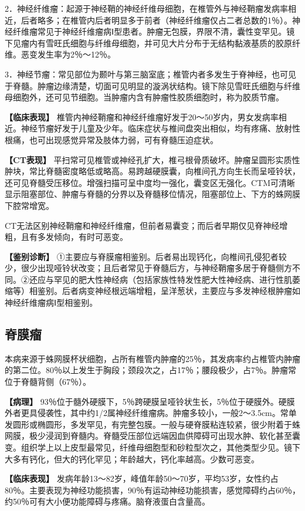 2．神经纤维瘤：起源于神经鞘的神经纤维母细胞，在椎管外与神经鞘瘤发病率相近，后者略多；在椎管内后者明显多于前者（神经纤维瘤仅占二者总数的1％）。神经纤维瘤常见于神经纤维瘤病Ⅰ型患者。肿瘤无包膜，界限不清，囊性变罕见。镜下见瘤内有雪旺氏细胞与纤维母细胞，并可见大片分布于无结构黏液基质的胶原纤维。恶变发生率为2％～12％。

3．神经节瘤：常见部位为颞叶与第三脑室底；椎管内者多发生于脊神经，也可见于脊髓。肿瘤边缘清楚，切面可见明显的漩涡状结构。镜下除见雪旺氏细胞与纤维母细胞外，还可见节细胞。当肿瘤内含有肿瘤性胶质细胞时，称为胶质节瘤。

\textbf{【临床表现】}
椎管内神经鞘瘤和神经纤维瘤好发于20～50岁内，男女发病率相近。神经节瘤好发于儿童及少年。临床症状与椎间盘突出相似，均有疼痛、放射性根痛，也可出现感觉异常及肢体力弱，可有脊髓压迫症状。

\textbf{【CT表现】}
平扫常可见椎管或神经孔扩大，椎弓根骨质破坏。肿瘤呈圆形实质性肿块，常比脊髓密度略低或略高。易跨越硬膜囊，向椎间孔方向生长而呈哑铃状，还可见脊髓受压移位。增强扫描可呈中度均一强化，囊变区无强化。CTM可清晰显示阻塞部位、肿瘤与脊髓的分界以及脊髓移位情况，阻塞部位上、下方的蛛网膜下腔常增宽。

CT无法区别神经鞘瘤和神经纤维瘤，但前者易囊变；而后者早期仅见脊神经增粗，且有多发倾向，有时可恶变。

\textbf{【鉴别诊断】}
①主要应与脊膜瘤相鉴别。后者易出现钙化，向椎间孔侵犯者较少，很少出现哑铃状改变；且后者常见于脊髓后方，与神经鞘瘤多居于脊髓侧方不同。②还应与罕见的肥大性神经病（包括家族性特发性肥大性神经病、进行性肌萎缩等）相鉴别。后者病变神经根远端增粗，呈洋葱状，主要应与多发神经根肿瘤如神经纤维瘤病Ⅰ型相鉴别。

\subsection{脊膜瘤}

本病来源于蛛网膜杯状细胞，占所有椎管内肿瘤的25％，其发病率约占椎管内肿瘤的第二位。80％以上发生于胸段；颈段次之，占17％；腰段极少，占7％。肿瘤常位于脊髓背侧（67％）。

\textbf{【病理】}
93％位于髓外硬膜下，5％跨硬膜呈哑铃状生长，5％位于硬膜外。硬膜外者更具侵袭性，其中约1/2属神经纤维瘤病。肿瘤多较小，一般2～3.5cm。常单发圆形或椭圆形，多发罕见，有完整包膜。一般与硬脊膜粘连较紧，很少附着于蛛网膜，极少浸润到脊髓内。脊髓受压部位远端因血供障碍可出现水肿、软化甚至囊变。组织学上以上皮型最常见，纤维母细胞型和砂粒型次之，其他类型少见。镜下大多有钙化，但大的钙化罕见；年龄越大，钙化率越高。少数可恶变。

\textbf{【临床表现】}
发病年龄13～82岁，峰值年龄50～70岁，平均53岁，女性约占80％。主要表现为神经功能损害，90％有运动神经功能损害，感觉障碍约占60％，约50％可有大小便功能障碍与疼痛。脑脊液蛋白含量高。

